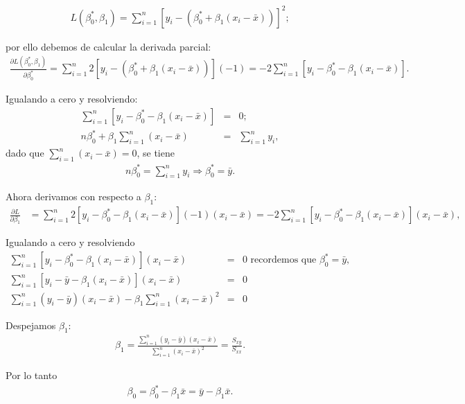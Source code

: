 \documentclass[12pt]{article}
\begin{document}
\begin{eqnarray*}
L(\beta_0^*, \beta_1) = \sum_{i=1}^{n} [y_i - (\beta_0^* + \beta_1(x_i - \bar{x}))]^2;
\end{eqnarray*}

por ello debemos de calcular la derivada parcial:
\begin{eqnarray*}
\frac{\partial L(\beta_0^*, \beta_1)}{\partial \beta_0^*} = \sum_{i=1}^{n} 2[y_i - (\beta_0^* + \beta_1(x_i - \bar{x}))](-1)= -2 \sum_{i=1}^{n} [y_i - \beta_0^* - \beta_1(x_i - \bar{x})].
\end{eqnarray*}

Igualando a cero y resolviendo:
\begin{eqnarray*}
\sum_{i=1}^{n} [y_i - \beta_0^* - \beta_1(x_i - \bar{x})] &=& 0;\\
n \beta_0^* + \beta_1 \sum_{i=1}^{n}(x_i - \bar{x})& =& \sum_{i=1}^{n} y_i,
\end{eqnarray*}
dado que  $\sum_{i=1}^{n}(x_i - \bar{x}) = 0$, se tiene
\begin{eqnarray*}
n \beta_0^* = \sum_{i=1}^{n} y_i \Rightarrow \beta_0^* = \bar{y}.
\end{eqnarray*}

Ahora  derivamos con respecto a $\beta_1$:
\begin{eqnarray*}
\frac{\partial L}{\partial \beta_1} &= \sum_{i=1}^{n} 2[y_i - \beta_0^* - \beta_1(x_i - \bar{x})](-1)(x_i - \bar{x})= -2 \sum_{i=1}^{n} [y_i - \beta_0^* - \beta_1(x_i - \bar{x})](x_i - \bar{x}),
\end{eqnarray*}

Igualando a cero y resolviendo
\begin{eqnarray*}
\sum_{i=1}^{n} [y_i - \beta_0^* - \beta_1(x_i - \bar{x})](x_i - \bar{x}) &=& 0\textrm{ recordemos que }\beta_0^* = \bar{y},\\
\sum_{i=1}^{n} [y_i - \bar{y} - \beta_1(x_i - \bar{x})](x_i - \bar{x}) &=& 0\\
\sum_{i=1}^{n} (y_i - \bar{y})(x_i - \bar{x}) - \beta_1 \sum_{i=1}^{n} (x_i - \bar{x})^2 &=& 0
\end{eqnarray*}

Despejamos $\beta_1$:
\begin{eqnarray*}
\beta_1 = \frac{\sum_{i=1}^{n} (y_i - \bar{y})(x_i - \bar{x})}{\sum_{i=1}^{n} (x_i - \bar{x})^2} = \frac{S_{xy}}{S_{xx}}.
\end{eqnarray*}

Por lo tanto
\begin{eqnarray*}
\beta_0 = \beta_0^* - \beta_1 \bar{x} = \bar{y} - \beta_1 \bar{x}.
\end{eqnarray*}
\end{document}
